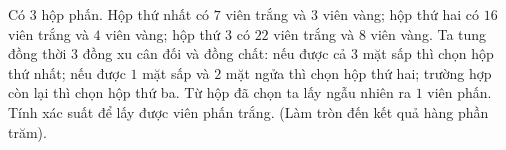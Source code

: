 \begin{ex}%
 Có $3$ hộp phấn. Hộp thứ nhất có $7$ viên trắng và $3$ viên vàng; hộp thứ hai có $16$ viên trắng và $4$ viên vàng; hộp thứ $3$ có $22$ viên trắng và $8$ viên vàng. Ta tung đồng thời $3$ đồng xu cân đối và đồng chất: nếu được cả $3$ mặt sấp thì chọn hộp thứ nhất; nếu được $1$ mặt sấp và $2$ mặt ngửa thì chọn hộp thứ hai; trường hợp còn lại thì chọn hộp thứ ba. Từ hộp đã chọn ta lấy ngẫu nhiên ra $1$ viên phấn. Tính xác suất để lấy được viên phấn trắng. (Làm tròn đến kết quả hàng phần trăm).
\end{ex}

